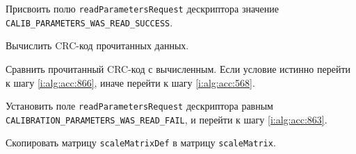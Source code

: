 \begin{enumerate_step}
    \item Присвоить полю \lstinline|readParametersRequest| дескриптора значение \lstinline|CALIB_PARAMETERS_WAS_READ_SUCCESS|.
    \item Вычислить CRC-код прочитанных данных.
    \item Сравнить прочитанный CRC-код с вычисленным. Если условие истинно перейти к шагу \ref{i:alg:acc:866}, иначе перейти к шагу \ref{i:alg:acc:568}.
    \item \label{i:alg:acc:568} Установить поле \lstinline|readParametersRequest| дескриптора равным \lstinline|CALIBRATION_PARAMETERS_WAS_READ_FAIL|, и перейти к шагу \ref{i:alg:acc:863}.
    \item \label{i:alg:acc:863} Скопировать матрицу \lstinline|scaleMatrixDef| в матрицу \lstinline|scaleMatrix|.
    

\end{enumerate_step}
